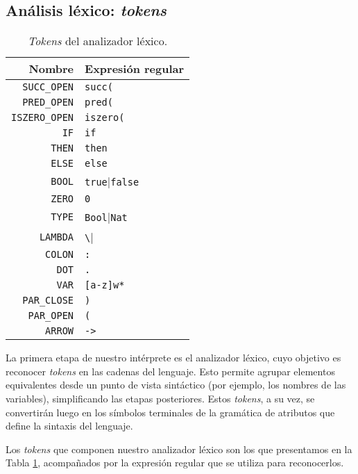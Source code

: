 \documentclass[11pt]{article}
\begin{document}

\subsection{Análisis léxico: \emph{tokens}}

\begin{table}[h] \centering
\begin{tabular}{rl}
Nombre                  & Expresión regular \\ \hline
\verb|SUCC_OPEN|        & \verb|succ(| \\
\verb|PRED_OPEN|        & \verb|pred(| \\
\verb|ISZERO_OPEN|      & \verb|iszero(| \\
\verb|IF|               & \verb|if| \\
\verb|THEN|             & \verb|then| \\
\verb|ELSE|             & \verb|else| \\
\verb|BOOL|             & \verb|true||\verb|false| \\
\verb|ZERO|             & \verb|0| \\
\verb|TYPE|             & \verb|Bool||\verb|Nat| \\
\verb|LAMBDA|           & \verb|\| \\
\verb|COLON|            & \verb|:| \\
\verb|DOT|              & \verb|.| \\
\verb|VAR|              & \verb|[a-z]w*| \\
\verb|PAR_CLOSE|        & \verb|)| \\
\verb|PAR_OPEN|         & \verb|(| \\
\verb|ARROW|            & \verb|->| \\
\end{tabular}
\caption{\emph{Tokens} del analizador léxico.}
\label{table:tokens-lexer}
\end{table}

La primera etapa de nuestro intérprete es el analizador léxico, cuyo objetivo
es reconocer \emph{tokens} en las cadenas del lenguaje. Esto permite agrupar
elementos equivalentes desde un punto de vista sintáctico (por ejemplo, los
nombres de las variables), simplificando las etapas posteriores. Estos
\emph{tokens}, a su vez, se convertirán luego en los símbolos terminales
de la gramática de atributos que define la sintaxis del lenguaje.

Los \emph{tokens} que componen nuestro analizador léxico son los que
presentamos en la Tabla \ref{table:tokens-lexer}, acompañados por la expresión
regular que se utiliza para reconocerlos.
\end{document}
